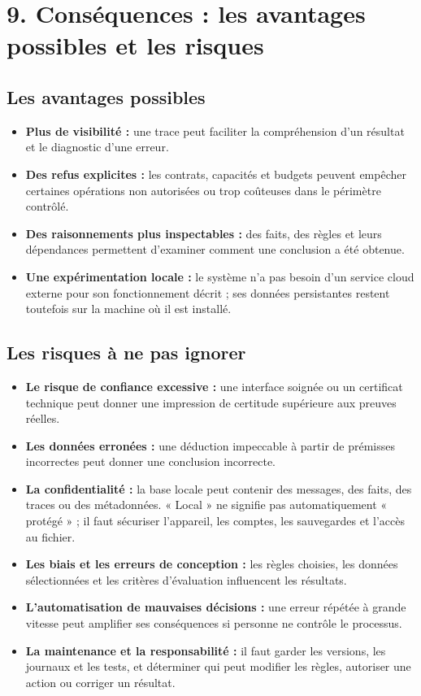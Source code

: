 \documentclass[11pt,a4paper]{article}
\begin{document}
\section*{9. Conséquences : les avantages possibles et les risques}

\subsection*{Les avantages possibles}

\begin{itemize}
  \item \textbf{Plus de visibilité :} une trace peut faciliter la compréhension d'un résultat et le diagnostic d'une erreur.
  \item \textbf{Des refus explicites :} les contrats, capacités et budgets peuvent empêcher certaines opérations non autorisées ou trop coûteuses dans le périmètre contrôlé.
  \item \textbf{Des raisonnements plus inspectables :} des faits, des règles et leurs dépendances permettent d'examiner comment une conclusion a été obtenue.
  \item \textbf{Une expérimentation locale :} le système n'a pas besoin d'un service cloud externe pour son fonctionnement décrit ; ses données persistantes restent toutefois sur la machine où il est installé.
\end{itemize}

\subsection*{Les risques à ne pas ignorer}

\begin{itemize}
  \item \textbf{Le risque de confiance excessive :} une interface soignée ou un certificat technique peut donner une impression de certitude supérieure aux preuves réelles.
  \item \textbf{Les données erronées :} une déduction impeccable à partir de prémisses incorrectes peut donner une conclusion incorrecte.
  \item \textbf{La confidentialité :} la base locale peut contenir des messages, des faits, des traces ou des métadonnées. « Local » ne signifie pas automatiquement « protégé » ; il faut sécuriser l'appareil, les comptes, les sauvegardes et l'accès au fichier.
  \item \textbf{Les biais et les erreurs de conception :} les règles choisies, les données sélectionnées et les critères d'évaluation influencent les résultats.
  \item \textbf{L'automatisation de mauvaises décisions :} une erreur répétée à grande vitesse peut amplifier ses conséquences si personne ne contrôle le processus.
  \item \textbf{La maintenance et la responsabilité :} il faut garder les versions, les journaux et les tests, et déterminer qui peut modifier les règles, autoriser une action ou corriger un résultat.
\end{itemize}
\end{document}
